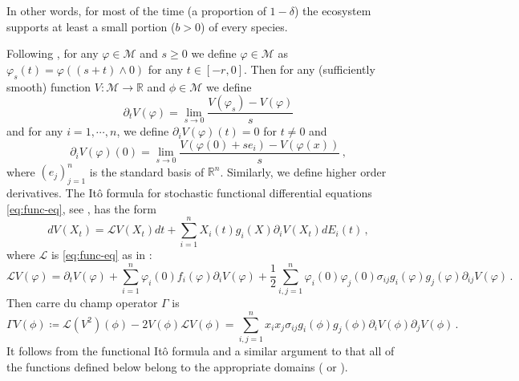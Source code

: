 \documentclass[final]{amsart}
\numberwithin{thm}{section}
\numberwithin{equation}{section}
\newcommand{\mcM}{\mathcal{M}}
\newcommand{\R}{\mathbb{R}}
\newcommand{\Ll}{\mathcal{L}}
\begin{document}
In other words, for most of the time (a proportion of $1 - \delta$) the ecosystem supports at least a small portion ($b > 0$) of every species.

Following \cite{functional}, 
for any $\varphi \in \mcM$ and $s \geq 0$ we define $\varphi \in \mcM$ as
$\varphi_s(t) = \varphi((s+t)\wedge 0)$ for any $t \in [-r, 0]$. 
Then
for any (sufficiently smooth) function $V : \mcM \to \R$ and $\phi \in \mcM$ we define 
\begin{equation}
    \partial_t V (\varphi) = \lim_{s \to 0} \frac{V(\varphi_s) - V(\varphi)}{s}
\end{equation}
and for any $i = 1, \cdots, n$, we define
$\partial_i V (\varphi)(t) = 0$  for $t \neq 0$ and 
\begin{equation}
    \partial_i V (\varphi)(0) = \lim_{s \to 0} \frac{V(\varphi(0) + se_i) - V(\varphi(x))}{s} \,,
\end{equation}
where $(e_j)_{j = 1}^n$ is the standard basis of $\R^n$. Similarly, we define higher order derivatives. 
The It\^{o} formula for stochastic functional differential equations \eqref{eq:func-eq}, see \cite[(3.3)]{functional},  has the form
\begin{equation}
    dV(X_t) = \Ll V(X_t) dt + \sum_{i = 1}^n X_i(t)g_i(X) \partial_iV(X_t) dE_i(t) \,,
\end{equation}
where $\Ll$ is \eqref{eq:func-eq} as in \cite[(3.2)]{functional}: 
\begin{equation}\label{eq:lske}
    \Ll V(\varphi) = \partial_tV(\varphi) + 
    \sum_{i = 1}^n \varphi_i(0) f_i(\varphi) \partial_iV(\varphi) + 
    \frac{1}{2} \sum_{i, j = 1}^n \varphi_i(0)\varphi_j(0)
    \sigma_{ij} g_i(\varphi)g_j(\varphi) \partial_{ij}V(\varphi) \,.
\end{equation}
Then  carre du champ operator $\Gamma$ is 
$$
\Gamma V(\phi) \coloneqq \Ll (V^2)(\phi) - 2V(\phi)\Ll V(\phi) = \sum_{i,j = 1}^n x_ix_j\sigma_{ij}g_i(\phi)g_j(\phi)\partial_i V(\phi)\partial_j V(\phi) \,.
$$ 
It follows from the functional It\^{o} formula and a similar argument to \cite[Lemma 4.1, Corollary 4.2]{extinction} that all of the functions defined below belong to the appropriate domains ( or ).
\end{document}
